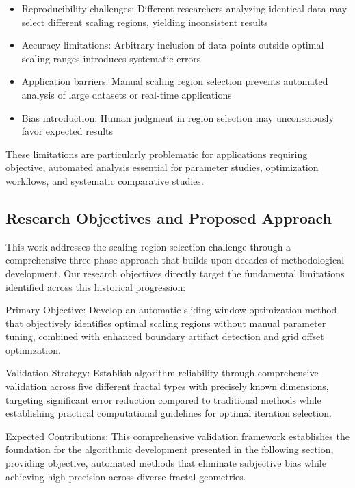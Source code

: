 \documentclass[preprint,12pt]{elsarticle}
\def\textbf#1{#1}%
\begin{document}
\begin{itemize}
\item \textbf{Reproducibility challenges}: Different researchers analyzing identical data may select different scaling regions, yielding inconsistent results
\item \textbf{Accuracy limitations}: Arbitrary inclusion of data points outside optimal scaling ranges introduces systematic errors
\item \textbf{Application barriers}: Manual scaling region selection prevents automated analysis of large datasets or real-time applications
\item \textbf{Bias introduction}: Human judgment in region selection may unconsciously favor expected results
\end{itemize}

These limitations are particularly problematic for applications requiring objective, automated analysis essential for parameter studies, optimization workflows, and systematic comparative studies.

\subsection{Research Objectives and Proposed Approach}

This work addresses the scaling region selection challenge through a comprehensive three-phase approach that builds upon decades of methodological development. Our research objectives directly target the fundamental limitations identified across this historical progression:

\textbf{Primary Objective}: Develop an automatic sliding window optimization method that objectively identifies optimal scaling regions without manual parameter tuning, combined with enhanced boundary artifact detection and grid offset optimization.

\textbf{Validation Strategy}: Establish algorithm reliability through comprehensive validation across five different fractal types with precisely known dimensions, targeting significant error reduction compared to traditional methods while establishing practical computational guidelines for optimal iteration selection.

\textbf{Expected Contributions}: This comprehensive validation framework establishes the foundation for the algorithmic development presented in the following section, providing objective, automated methods that eliminate subjective bias while achieving high precision across diverse fractal geometries.
\end{document}
